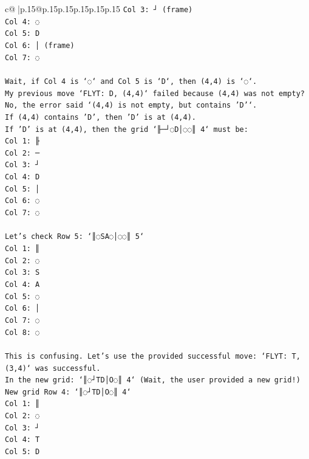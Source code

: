 \documentclass{article}
\begin{document}
{\begin{supertabular}{c@{$\;$}|p{.15\linewidth}@{}p{.15\linewidth}p{.15\linewidth}p{.15\linewidth}p{.15\linewidth}p{.15\linewidth}}
{{{\texttt{Col 3: ┘ (frame)} \\
\texttt{Col 4: ◌} \\
\texttt{Col 5: D} \\
\texttt{Col 6: │ (frame)} \\
\texttt{Col 7: ◌} \\
\\ 
\texttt{Wait, if Col 4 is `◌` and Col 5 is `D`, then (4,4) is `◌`.} \\
\texttt{My previous move `FLYT: D, (4,4)` failed because (4,4) was not empty? No, the error said `(4,4) is not empty, but contains 'D'`.} \\
\texttt{If (4,4) contains 'D', then 'D' is at (4,4).} \\
\texttt{If 'D' is at (4,4), then the grid `╟─┘◌D│◌◌║ 4` must be:} \\
\texttt{Col 1: ╟} \\
\texttt{Col 2: ─} \\
\texttt{Col 3: ┘} \\
\texttt{Col 4: D} \\
\texttt{Col 5: │} \\
\texttt{Col 6: ◌} \\
\texttt{Col 7: ◌} \\
\\ 
\texttt{Let's check Row 5: `║◌SA◌│◌◌║ 5`} \\
\texttt{Col 1: ║} \\
\texttt{Col 2: ◌} \\
\texttt{Col 3: S} \\
\texttt{Col 4: A} \\
\texttt{Col 5: ◌} \\
\texttt{Col 6: │} \\
\texttt{Col 7: ◌} \\
\texttt{Col 8: ◌} \\
\\ 
\texttt{This is confusing. Let's use the provided successful move: `FLYT: T, (3,4)` was successful.} \\
\texttt{In the new grid: `║◌┘TD│O◌║ 4` (Wait, the user provided a new grid!)} \\
\texttt{New grid Row 4: `║◌┘TD│O◌║ 4`} \\
\texttt{Col 1: ║} \\
\texttt{Col 2: ◌} \\
\texttt{Col 3: ┘} \\
\texttt{Col 4: T} \\
\texttt{Col 5: D} \\
}}}
\end{supertabular}}
\end{document}
